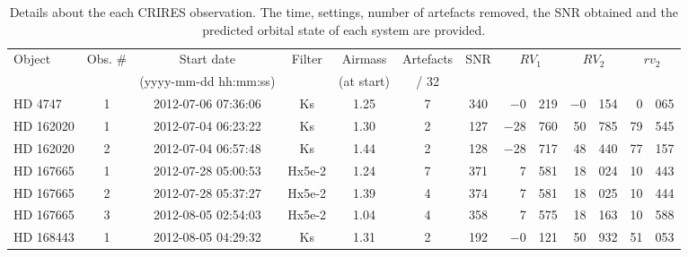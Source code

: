 
\begin{table*}
    \small
        \centering
        \begin{threeparttable}[b]

            \caption{Details about the each {CRIRES} observation. {\rd{} The time, settings, number of artefacts removed, the {SNR} obtained and the predicted orbital state of each system are provided.}}
            \begin{tabular}{l c c c c c c r@{.}l r@{.}l r@{.}l}
                \toprule
                Object & Obs. \# & Start date  & Filter & Airmass  & Artefacts & {SNR} & \multicolumn{2}{c}{\(RV_1\)} & \multicolumn{2}{c}{\(RV_2\)} & \multicolumn{2}{c}{\(rv_2\)}  \\  %
                &   & (yyyy-mm-dd hh:mm:ss)  &  & (at start) & {\red{} / 32} & & \multicolumn{2}{c}{\kmps{}} & \multicolumn{2}{c}{\kmps{}} & \multicolumn{2}{c}{\kmps{}}\\ %
                \midrule
                {HD 4747}   & 1 & 2012-07-06 07:36:06 & Ks            & 1.25     & 7 & 340 & $-$0 & 219 & $-$0  & 154 & 0&065 \\ %
                {HD 162020} & 1 & 2012-07-04 06:23:22 & Ks      & 1.30  & 2 & 127 & $-$28  & 760 & 50 & 785\tnote{a}  & 79&545\tnote{a} \\ %
                {HD 162020} & 2 & 2012-07-04 06:57:48 & Ks      & 1.44   & 2 & 128 & $-$28  & 717 & 48 & 440\tnote{a} & 77&157\tnote{a} \\ %
                {HD 167665} & 1 & 2012-07-28 05:00:53 & Hx5e-2  & 1.24  & 7 & 371 & 7      & 581 & 18 & 024\tnote{a} & 10&443\tnote{a} \\ %
                {HD 167665} & 2 & 2012-07-28 05:37:27 & Hx5e-2  & 1.39   & 4 & 374 & 7      & 581 & 18 & 025\tnote{a}  & 10&444\tnote{a} \\ %
                {HD 167665} & 3 & 2012-08-05 02:54:03 & Hx5e-2  & 1.04   & 4 & 358 & 7      & 575 & 18 & 163\tnote{a} & 10&588\tnote{a} \\ %
                {HD 168443} & 1 & 2012-08-05 04:29:32 & Ks      & 1.31  & 2& 192 & $-$0   & 121 & 50 & 932\tnote{a,b}  & 51&053\tnote{a,b} \\ %

\end{tabular}
\end{threeparttable}
\end{table*}
